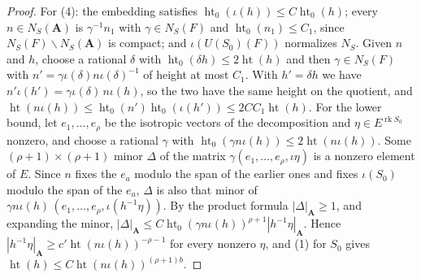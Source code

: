 \begin{proof}
For (4): the embedding satisfies $\operatorname{ht}_0(\iota(h))\leq
C\operatorname{ht}_0(h)$; every $n\in N_S(\mathbf A)$ is $\gamma^{-1}n_1$ with
$\gamma\in N_S(F)$ and $\operatorname{ht}_0(n_1)\leq C_1$, since
$N_S(F)\backslash N_S(\mathbf A)$ is compact; and $\iota(U(S_0)(F))$ normalizes
$N_S$. Given $n$ and $h$, choose a rational $\delta$ with
$\operatorname{ht}_0(\delta h)\leq2\operatorname{ht}(h)$ and then $\gamma\in N_S(F)$
with $n'=\gamma\iota(\delta)n\iota(\delta)^{-1}$ of height at most $C_1$. With
$h'=\delta h$ we have $n'\iota(h')=\gamma\iota(\delta)\,n\iota(h)$, so the two have
the same height on the quotient, and
$\operatorname{ht}(n\iota(h))\leq\operatorname{ht}_0(n')\operatorname{ht}_0(\iota(h'))
\leq2CC_1\operatorname{ht}(h)$. For the lower bound, let $e_1,\ldots,e_\rho$ be the
isotropic vectors of the decomposition and $\eta\in E^{\operatorname{rk}S_0}$
nonzero, and choose a rational $\gamma$ with
$\operatorname{ht}_0(\gamma n\iota(h))\leq2\operatorname{ht}(n\iota(h))$. Some
$(\rho+1)\times(\rho+1)$ minor $\Delta$ of the matrix $\gamma(e_1,\ldots,e_\rho,\iota\eta)$
is a nonzero element of $E$. Since $n$ fixes the $e_a$ modulo the span of the
earlier ones and fixes $\iota(S_0)$ modulo the span of the $e_a$, $\Delta$ is
also that minor of $\gamma n\iota(h)\,(e_1,\ldots,e_\rho,\iota(h^{-1}\eta))$. By
the product formula $|\Delta|_{\mathbf A}\geq1$, and expanding the minor,
$|\Delta|_{\mathbf A}\leq C\operatorname{ht}_0(\gamma n\iota(h))^{\rho+1}|h^{-1}\eta|_{\mathbf A}$.
Hence $|h^{-1}\eta|_{\mathbf A}\geq c'\operatorname{ht}(n\iota(h))^{-\rho-1}$
for every nonzero $\eta$, and (1) for $S_0$ gives
$\operatorname{ht}(h)\leq C\operatorname{ht}(n\iota(h))^{(\rho+1)b}$.
\end{proof}

